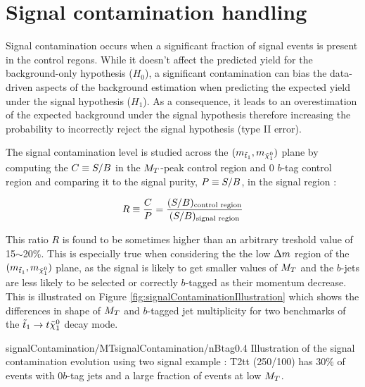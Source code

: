     \section{Signal contamination handling}

        Signal contamination occurs when a significant fraction of signal events is present in
        the control regons. While it doesn't affect the predicted yield for the background-only hypothesis
        ($H_0$), a significant contamination can bias the data-driven aspects of the background
        estimation when predicting the expected yield under the signal hypothesis ($H_1$). As a
        consequence, it leads to an overestimation of the expected background under the signal hypothesis
        therefore increasing the probability to incorrectly reject the signal hypothesis (type II error).
        
        The signal contamination level is studied across the $(m_{\tilde{t}_1},m_{\tilde{\chi}_1^0})$
        plane by computing the $C \equiv S/B$ in the $M_T$-peak control region and 0 $b$-tag
        control region and comparing it to the signal purity, $P \equiv S/B$, in the signal region :

        \begin{equation}
            R \equiv \frac{C}{P} = \frac{(S/B)_\text{control region}}{(S/B)_\text{signal region}}
            \label{eq:contaminationRatio}
        \end{equation}
      
        This ratio $R$ is found to be sometimes higher than an arbitrary treshold value of 15$\sim$20\%.
        This is especially true when considering the the low $\Delta m$ region of the $(m_{\tilde{t}_1},
        m_{\tilde{\chi}_1^0})$ plane, as the signal is likely to get smaller values of $M_T$ and the $b$-jets
        are less likely to be selected or correctly $b$-tagged as their momentum decrease. This is illustrated
        on Figure \ref{fig:signalContaminationIllustration} which shows the differences in shape of $M_T$ and
        $b$-tagged jet multiplicity for two benchmarks of the $\tilde{t}_1 \rightarrow t \tilde{\chi}_1^0$ decay mode.
      

                         {signalContamination/MT}{signalContamination/nBtag}{0.4}
                         {Illustration of the signal contamination evolution using two signal example : T2tt (250/100) has 30\% of events with 0$b$-tag jets and a large fraction of events at low $M_T$.}
    
